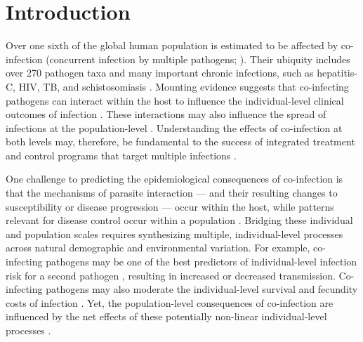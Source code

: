 \documentclass[10pt,letterpaper]{article}
\begin{document}

\section*{Introduction}
Over one sixth of the global human population is estimated to be affected by co-infection (concurrent infection by multiple pathogens; \cite{griffiths_nature_2011}). 
Their ubiquity includes over 270 pathogen taxa and many important chronic infections, such as hepatitis-C, HIV, TB, and schistosomiasis \cite{griffiths_nature_2011, gandhi_extensively_2006, alter_epidemiology_2006}. 
Mounting evidence suggests that co-infecting pathogens can interact within the host to influence the individual-level clinical outcomes of infection \cite{beechler_enemies_2015, graham_malaria-filaria_2005}. 
These interactions may also influence the spread of infections at the population-level \cite{abu-raddad_dual_2006, ezenwa_opposite_2015}. 
Understanding the effects of co-infection at both levels may, therefore, be fundamental to the success of integrated treatment and control programs that target multiple infections \cite{abdool_karim_integration_2011, hotez_incorporating_2006}.


One challenge to predicting the epidemiological consequences of co-infection is that the mechanisms of parasite interaction — and their resulting changes to susceptibility or disease progression — occur within the host, while patterns relevant for disease control occur within a population \cite{viney_chapter_2013}. 
Bridging these individual and population scales requires synthesizing multiple, individual-level processes across natural demographic and environmental variation. 
For example, co-infecting pathogens may be one of the best predictors of individual-level infection risk for a second pathogen \cite{lello_relative_2013, telfer_species_2010}, resulting in increased or decreased transmission. 
Co-infecting pathogens may also moderate the individual-level survival and fecundity costs of infection \cite{beechler_enemies_2015, pedersen_interaction_2008}. 
Yet, the population-level consequences of co-infection are influenced by the net effects of these potentially non-linear individual-level processes \cite{martcheva_role_2006, vasco_tracking_2007}.
\end{document}
